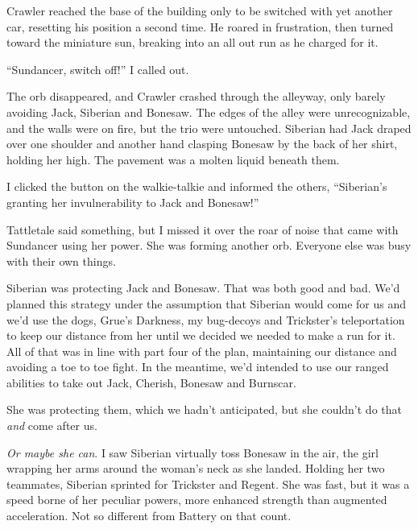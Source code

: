 Crawler reached the base of the building only to be switched with yet another car, resetting his position a second time.  He roared in frustration, then turned toward the miniature sun, breaking into an all out run as he charged for it.



``Sundancer, switch off!''  I called out.



The orb disappeared, and Crawler crashed through the alleyway, only barely avoiding Jack, Siberian and Bonesaw.  The edges of the alley were unrecognizable, and the walls were on fire, but the trio were untouched.  Siberian had Jack draped over one shoulder  and another hand clasping Bonesaw by the back of her shirt, holding her high.  The pavement was a molten liquid beneath them.



I clicked the button on the walkie-talkie and informed the others, ``Siberian's granting her invulnerability to Jack and Bonesaw!''



Tattletale said something, but I missed it over the roar of noise that came with Sundancer using her power.  She was forming another orb.  Everyone else was busy with their own things.



Siberian was protecting Jack and Bonesaw.  That was both good and bad.  We'd planned this strategy under the assumption that Siberian would come for us and we'd use the dogs, Grue's Darkness, my bug-decoys and Trickster's teleportation to keep our distance from her until we decided we needed to make a run for it.  All of that was in line with part four of the plan, maintaining our distance and avoiding a toe to toe fight.  In the meantime, we'd intended to use our ranged abilities to take out Jack, Cherish, Bonesaw and Burnscar.



She was protecting them, which we hadn't anticipated, but she couldn't do that \emph{and} come after us.



\emph{Or maybe she can}.  I saw Siberian virtually toss Bonesaw in the air, the girl wrapping her arms around the woman's neck as she landed.  Holding her two teammates, Siberian sprinted for Trickster and Regent.  She was fast, but it was a speed borne of her peculiar powers, more enhanced strength than augmented acceleration.  Not so different from Battery on that count.




